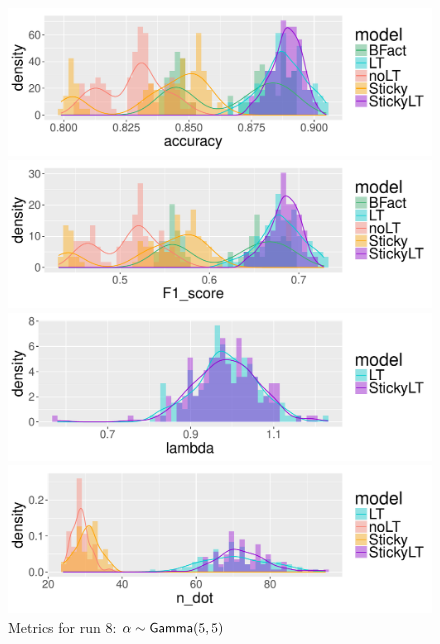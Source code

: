 \begin{figure}[tb]
  \centering
  \begin{minipage}{0.75\textwidth}
  \includegraphics[width = \textwidth]{fig/cocktail/synth_s16_m12/hyper_alpha/h10.0_nocs_cp0/a5b5/accuracy_density.pdf}
\end{minipage}

\begin{minipage}{0.75\textwidth}
  \includegraphics[width = \textwidth]{fig/cocktail/synth_s16_m12/hyper_alpha/h10.0_nocs_cp0/a5b5/F1_score_density.pdf}
\end{minipage}

\begin{minipage}{0.75\textwidth}
  \includegraphics[width = \textwidth]{fig/cocktail/synth_s16_m12/hyper_alpha/h10.0_nocs_cp0/a5b5/lambda_density.pdf}
\end{minipage}

\begin{minipage}{0.75\textwidth}
  \includegraphics[width = \textwidth]{fig/cocktail/synth_s16_m12/hyper_alpha/h10.0_nocs_cp0/a5b5/n_dot_density.pdf}
\end{minipage}
\caption{Metrics for run 8: $\alpha \sim \mathsf{Gamma}(5,5)$}
\end{figure}

